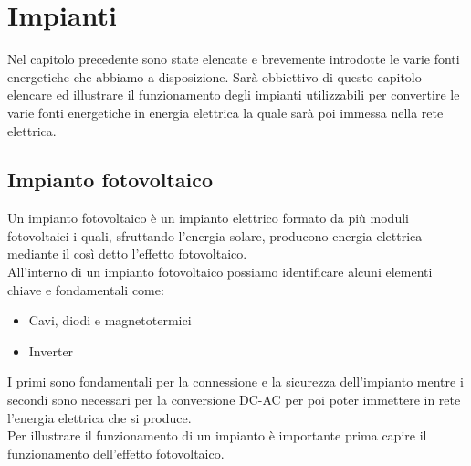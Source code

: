 
\chapter{Impianti}
\label{chp:impianti}
Nel capitolo precedente sono state elencate e brevemente introdotte le varie fonti energetiche che abbiamo a disposizione. Sarà obbiettivo di questo capitolo elencare ed illustrare il funzionamento degli impianti utilizzabili per convertire le varie fonti energetiche in energia elettrica la quale sarà poi immessa nella rete elettrica.\\
\section{Impianto fotovoltaico}
Un impianto fotovoltaico è un impianto elettrico formato da più moduli fotovoltaici i quali, sfruttando l'energia solare, producono energia elettrica mediante il così detto l'effetto fotovoltaico.\\
All'interno di un impianto fotovoltaico possiamo identificare alcuni elementi chiave e fondamentali come:
\begin{itemize}
    \item Cavi, diodi e magnetotermici
    \item Inverter
\end{itemize}
I primi sono fondamentali per la connessione e la sicurezza dell'impianto mentre i secondi sono necessari per la conversione DC-AC per poi poter immettere in rete l'energia elettrica che si produce.\\
Per illustrare il funzionamento di un impianto è importante prima capire il funzionamento dell'effetto fotovoltaico.\\
